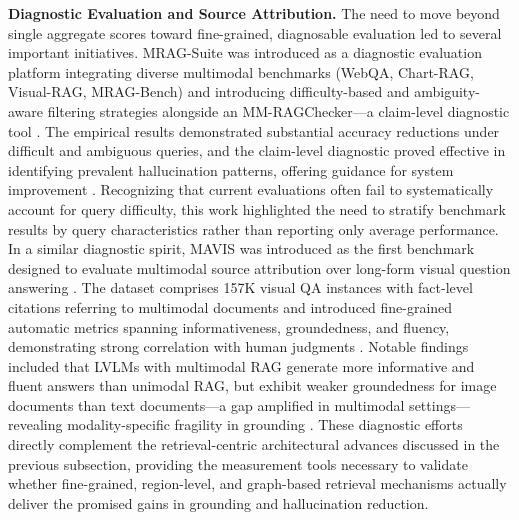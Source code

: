 \documentclass[11pt]{article}
\begin{document}
\textbf{Diagnostic Evaluation and Source Attribution.} The need to move beyond single aggregate scores toward fine-grained, diagnosable evaluation led to several important initiatives. MRAG-Suite was introduced as a diagnostic evaluation platform integrating diverse multimodal benchmarks (WebQA, Chart-RAG, Visual-RAG, MRAG-Bench) and introducing difficulty-based and ambiguity-aware filtering strategies alongside an MM-RAGChecker---a claim-level diagnostic tool \cite{ref364}. The empirical results demonstrated substantial accuracy reductions under difficult and ambiguous queries, and the claim-level diagnostic proved effective in identifying prevalent hallucination patterns, offering guidance for system improvement \cite{ref364}. Recognizing that current evaluations often fail to systematically account for query difficulty, this work highlighted the need to stratify benchmark results by query characteristics rather than reporting only average performance. In a similar diagnostic spirit, MAVIS was introduced as the first benchmark designed to evaluate multimodal source attribution over long-form visual question answering \cite{ref365}. The dataset comprises 157K visual QA instances with fact-level citations referring to multimodal documents and introduced fine-grained automatic metrics spanning informativeness, groundedness, and fluency, demonstrating strong correlation with human judgments \cite{ref365}. Notable findings included that LVLMs with multimodal RAG generate more informative and fluent answers than unimodal RAG, but exhibit weaker groundedness for image documents than text documents---a gap amplified in multimodal settings---revealing modality-specific fragility in grounding \cite{ref365}. These diagnostic efforts directly complement the retrieval-centric architectural advances discussed in the previous subsection, providing the measurement tools necessary to validate whether fine-grained, region-level, and graph-based retrieval mechanisms actually deliver the promised gains in grounding and hallucination reduction.
\end{document}
